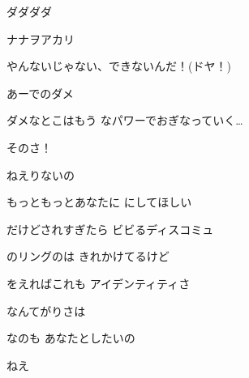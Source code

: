 \documentclass[a4paper,tate,twocolumn,12pt]{ltjtarticle}
\begin{document}
\thispagestyle{empty}

\begin{center}
{\LARGE ダダダダ}

{\large ナナヲアカリ}
\end{center}

\vspace{1em}

\begin{flushleft}

\noindent\begin{minipage}{\linewidth}
やんないじゃない、できないんだ！(ドヤ！)
\end{minipage}

\vspace{2em}

\noindent\begin{minipage}{\linewidth}
あーでのダメ

ダメなとこはもう なパワーでおぎなっていく…

そのさ！
\end{minipage}

\vspace{2em}

\noindent\begin{minipage}{\linewidth}
ねえりないの

もっともっとあなたに にしてほしい

だけどされすぎたら ビビるディスコミュ
\end{minipage}

\vspace{2em}

\noindent\begin{minipage}{\linewidth}
のリングのは きれかけてるけど

をえればこれも アイデンティティさ

なんてがりさは

なのも あなたとしたいの
\end{minipage}

\vspace{2em}

\noindent\begin{minipage}{\linewidth}
ねえ


\end{minipage}
\end{flushleft}
\end{document}
